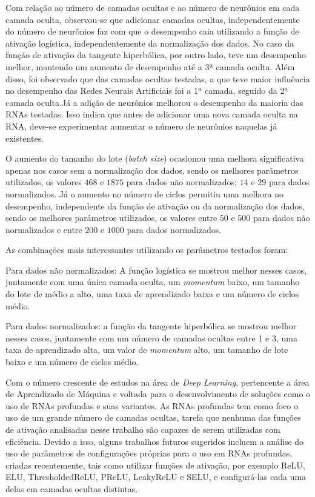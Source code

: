\documentclass[12pt,oneside,a4paper,chapter=TITLE,section=TITLE,sumario
		=tradicional]{abntex2}
\begin{document}
		Com relação ao número de camadas ocultas e ao número de neurônios em cada camada oculta, observou-se que adicionar camadas ocultas, independentemente do número de neurônios faz com que o desempenho caia utilizando a função de ativação logística, independentemente da normalização dos dados. No caso da função de ativação da tangente hiperbólica, por outro lado, teve um desempenho melhor, mantendo um aumento de desempenho até a 3ª camada oculta. Além disso, foi observado que das camadas ocultas testadas, a que teve maior influência no desempenho das Redes Neurais Artificiais foi a 1ª camada, seguido da 2ª camada oculta.\hspace{0.1cm}Já a adição de neurônios melhorou o desempenho da maioria das RNAs testadas. Isso indica que antes de adicionar uma nova camada oculta na RNA, deve-se experimentar aumentar o número de neurônios naquelas já existentes.
		
		O aumento do tamanho do lote (\textit{batch size}) ocasionou uma melhora significativa apenas nos casos sem a normalização dos dados, sendo os melhores parâmetros utilizados, os valores $468$ e $1875$ para dados não normalizados; $14$ e $29$ para dados normalizados. Já o aumento no número de ciclos permitiu uma melhora no desempenho, independente da função de ativação ou da normalização dos dados, sendo os melhores parâmetros utilizados, os valores entre $50$ e $500$ para dados não normalizados e entre $200$ e $1000$ para dados normalizados.
		
		As combinações mais interessantes utilizando os parâmetros testados foram:
		
		\begin{lista}
			\item Para dados não normalizados: A função logística se mostrou melhor nesses casos, juntamente com uma única camada oculta, um \textit{momentum} baixo, um tamanho do lote de médio a alto, uma taxa de aprendizado baixa e um número de ciclos médio. 
			
			\item Para dados normalizados: a função da tangente hiperbólica se mostrou melhor nesses casos, juntamente com um número de camadas ocultas entre 1 e 3, uma taxa de aprendizado alta, um valor de \textit{momentum} alto, um tamanho de lote baixo e um número de ciclos médio.
			
		\end{lista}
		
		Com o número crescente de estudos na área de \textit{Deep Learning}, pertencente a área de Aprendizado de Máquina e voltada para o desenvolvimento de soluções como o uso de RNAs profundas e suas variantes. As RNAs profundas tem como foco o uso de um grande número de camadas ocultas, tarefa que nenhuma das funções de ativação analisadas nesse trabalho são capazes de serem utilizadas com eficiência. Devido a isso, alguns trabalhos futuros sugeridos incluem a análise do uso de parâmetros de configurações próprias para o uso em RNAs profundas, criadas recentemente, tais como utilizar funções de ativação, por exemplo ReLU, ELU, ThresholdedReLU, PReLU, LeakyReLU e SELU, e configurá-las cada uma delas em camadas ocultas distintas. 
\end{document}

